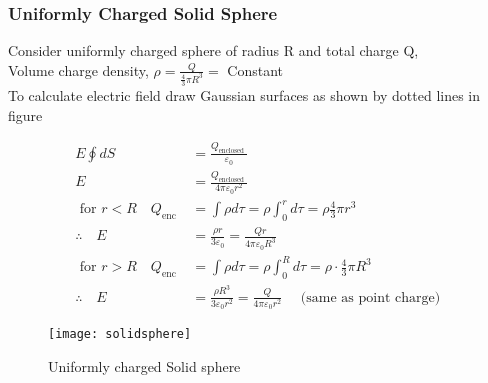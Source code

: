 \subsubsection{Uniformly Charged Solid Sphere}
Consider uniformly charged sphere of radius $\mathrm{R}$ and total charge $\mathrm{Q}$,
\\Volume charge density, $\rho=\frac{Q}{\frac{4}{3} \pi R^{3}}=$ Constant
\\To calculate electric field draw Gaussian surfaces as shown by dotted lines in figure \\\begin{minipage}{0.75\textwidth}
	\begin{align*}
	E \oint d S&=\frac{Q_{\text {enclosed }}}{\varepsilon_{0}} \\
	E&=\frac{Q_{\text {enclosed }}}{4 \pi \varepsilon_{0} r^{2}}\\
	\text { for } r<R \quad Q_{\text {enc }}&=\int \rho d \tau=\rho \int_{0}^{r} d \tau=\rho \frac{4}{3} \pi r^{3} \\
	\therefore \quad E&=\frac{\rho r}{3 \varepsilon_{0}}=\frac{Q r}{4 \pi \varepsilon_{0} R^{3}} \\
	\text { for } r>R \quad Q_{\text {enc }}&=\int \rho d \tau=\rho \int_{0}^{R} d \tau=\rho \cdot \frac{4}{3} \pi R^{3} \\
	\therefore \quad E&=\frac{\rho R^{3}}{3 \varepsilon_{0} r^{2}}=\frac{Q}{4 \pi \varepsilon_{0} r^{2}} \quad \text { (same as point charge) }
\end{align*}
\end{minipage}
\begin{minipage}{0.25\textwidth}
	\begin{figure}[H]
		\texttt{[image: solidsphere]}
		\caption{Uniformly charged Solid sphere}
	\end{figure}
\end{minipage}
